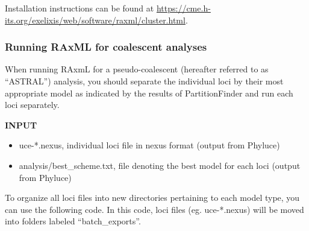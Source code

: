 \documentclass[
  12pt,
]{article}
\newenvironment{Shaded}{\begin{snugshade}}{\end{snugshade}}
\newcommand{\AttributeTok}[1]{\textcolor[rgb]{0.13,0.29,0.53}{#1}}
\newcommand{\BuiltInTok}[1]{#1}
\newcommand{\CommentTok}[1]{\textcolor[rgb]{0.56,0.35,0.01}{\textit{#1}}}
\newcommand{\FunctionTok}[1]{\textcolor[rgb]{0.13,0.29,0.53}{\textbf{#1}}}
\newcommand{\KeywordTok}[1]{\textcolor[rgb]{0.13,0.29,0.53}{\textbf{#1}}}
\newcommand{\NormalTok}[1]{#1}
\newcommand{\OperatorTok}[1]{\textcolor[rgb]{0.81,0.36,0.00}{\textbf{#1}}}
\newcommand{\StringTok}[1]{\textcolor[rgb]{0.31,0.60,0.02}{#1}}
\providecommand{\tightlist}{%
  \setlength{\itemsep}{0pt}\setlength{\parskip}{0pt}}
\begin{document}
Installation instructions can be found at \url{https://cme.h-its.org/exelixis/web/software/raxml/cluster.html}.

\hypertarget{running-raxml-for-coalescent-analyses}{%
\subsubsection{Running RAxML for coalescent analyses}\label{running-raxml-for-coalescent-analyses}}

When running RAxmL for a pseudo-coalescent (hereafter referred to as ``ASTRAL'') analysis, you should separate the individual loci by their most appropriate model as indicated by the results of PartitionFinder and run each loci separately.

\textbf{INPUT}

\begin{itemize}
\tightlist
\item
  uce-*.nexus, individual loci file in nexus format (output from Phyluce)
\item
  analysis/best\_scheme.txt, file denoting the best model for each loci (output from Phyluce)
\end{itemize}

To organize all loci files into new directories pertaining to each model type, you can use the following code. In this code, loci files (eg. uce-*.nexus) will be moved into folders labeled ``batch\_exports''.

\begin{Shaded}
\end{Shaded}
\end{document}
